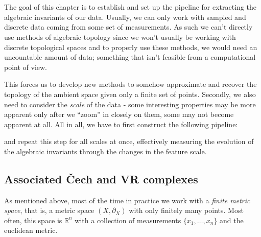 \chapter{}
\graphicspath{ {/home/tomasp/Dokumenty/Master_Thesis/figures/} }

The goal of this chapter is to establish and set up the pipeline for extracting the algebraic invariants of our data. Usually, we can only work with sampled and discrete data coming from some set of measurements. As such we can't directly use methods of algebraic topology since we won't usually be working with discrete topological spaces and to properly use these methods, we would need an uncountable amount of data; something that isn't feasible from a computational point of view.
\par
This forces us to develop new methods to somehow approximate and recover the topology of the ambient space given only a finite set of points. Secondly, we also need to consider the \textit{scale} of the data - some interesting properties may be more apparent only after we ``zoom'' in closely on them, some may not become apparent at all. All in all, we have to first construct the following pipeline:

\begin{center}
\end{center}

and repeat this step for all scales at once, effectively measuring the evolution of the algebraic invariants through the changes in the feature scale.

\section{Associated Čech and VR complexes}
As mentioned above, most of the time in practice we work with a \textit{finite metric space}, that is, a metric space $(X, \partial_{X})$ with only finitely many points. Most often, this space is $\mathbb{R}^{n}$ with a collection of measurements $\{x_{1}, \ldots, x_{n}\}$ and the euclidean metric.
